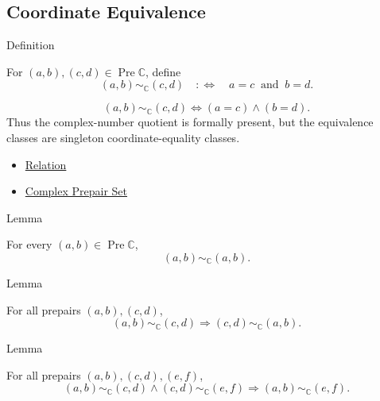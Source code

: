\subsection*{Coordinate Equivalence}

\begin{definitionbox}{Definition}
\begin{definition}
\label{def:complex-coordinate-equivalence}
For $(a,b),(c,d)\in\operatorname{Pre}\mathbb{C}$, define
\[
(a,b)\sim_{\mathbb{C}}(c,d)
\quad:\Longleftrightarrow\quad
a=c\ \text{ and }\ b=d.
\]
\end{definition}
\end{definitionbox}

\begin{remark*}
\[
(a,b)\sim_{\mathbb{C}}(c,d)
\Longleftrightarrow
(a=c)\land(b=d).
\]
Thus the complex-number quotient is formally present, but the equivalence
classes are singleton coordinate-equality classes.
\end{remark*}

\begin{dependencies}
\begin{itemize}
  \item \hyperref[def:relation]{Relation}
  \item \hyperref[def:complex-prepair-set]{Complex Prepair Set}
\end{itemize}
\end{dependencies}

\begin{lemmabox}{Lemma}
\begin{lemma}
\label{lem:complex-coordinate-equivalence-reflexive}
For every $(a,b)\in\operatorname{Pre}\mathbb{C}$,
\[
(a,b)\sim_{\mathbb{C}}(a,b).
\]
\end{lemma}
\end{lemmabox}

\begin{lemmabox}{Lemma}
\begin{lemma}
\label{lem:complex-coordinate-equivalence-symmetric}
For all prepairs $(a,b),(c,d)$,
\[
(a,b)\sim_{\mathbb{C}}(c,d)
\Longrightarrow
(c,d)\sim_{\mathbb{C}}(a,b).
\]
\end{lemma}
\end{lemmabox}

\begin{lemmabox}{Lemma}
\begin{lemma}
\label{lem:complex-coordinate-equivalence-transitive}
For all prepairs $(a,b),(c,d),(e,f)$,
\[
(a,b)\sim_{\mathbb{C}}(c,d)\land
(c,d)\sim_{\mathbb{C}}(e,f)
\Longrightarrow
(a,b)\sim_{\mathbb{C}}(e,f).
\]
\end{lemma}
\end{lemmabox}

